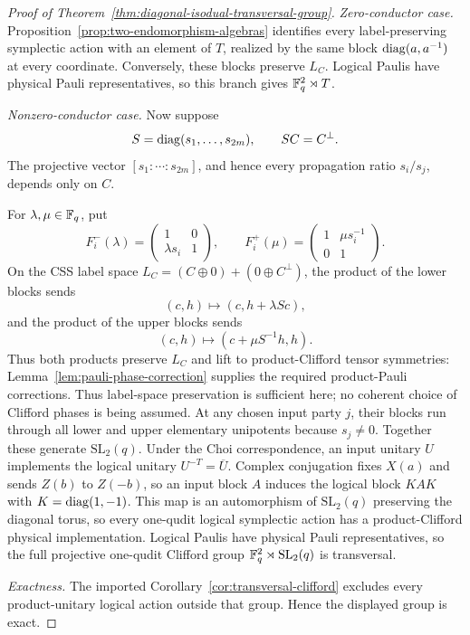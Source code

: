 \begin{proof}[Proof of
Theorem~\ref{thm:diagonal-isodual-transversal-group}]

\medskip\noindent\emph{Zero-conductor case.}
Proposition~\ref{prop:two-endomorphism-algebras} identifies every
label-preserving symplectic action with an element of \(T\), realized by the
same block \(\operatorname{diag}(a,a^{-1})\) at every coordinate.  Conversely, these blocks
preserve \(L_C\).  Logical Paulis have physical Pauli representatives, so this
branch gives \(\mathbb F_q^2\rtimes T\).

\medskip\noindent\emph{Nonzero-conductor case.}
Now suppose
\begin{equation}\label{eq:diagonal-duality-witness}
 S=\operatorname{diag}(s_1,\ldots,s_{2m}),\qquad SC=C^\perp .
\end{equation}
The projective vector \([s_1:\cdots:s_{2m}]\), and hence every propagation
ratio \(s_i/s_j\), depends only on \(C\).

For \(\lambda,\mu\in\mathbb F_q\), put
\begin{equation}\label{eq:duality-shears}
 F_i^-(\lambda)=
 \begin{pmatrix}1&0\\ \lambda s_i&1\end{pmatrix},
 \qquad
 F_i^+(\mu)=
 \begin{pmatrix}1&\mu s_i^{-1}\\0&1\end{pmatrix}.
\end{equation}
On the CSS label space
\(L_C=(C\oplus0)+(0\oplus C^\perp)\), the product of the lower blocks
sends
\[
 (c,h)\longmapsto(c,h+\lambda Sc),
\]
and the product of the upper blocks sends
\[
 (c,h)\longmapsto(c+\mu S^{-1}h,h).
\]
Thus both products preserve \(L_C\) and lift to product-Clifford tensor
symmetries: Lemma~\ref{lem:pauli-phase-correction} supplies the required
product-Pauli corrections.  Thus label-space preservation is sufficient
here; no coherent choice of Clifford phases is being assumed.
At any chosen input party \(j\), their blocks run through all lower and
upper elementary unipotents because \(s_j\ne0\).  Together these generate
\(\mathrm{SL}_2(q)\).  Under the Choi correspondence, an input unitary
\(U\) implements the logical unitary \(U^{-T}=\overline{U}\).  Complex
conjugation fixes \(X(a)\) and sends \(Z(b)\) to \(Z(-b)\), so an input
block \(A\) induces the logical block \(KAK\) with \(K=\operatorname{diag}(1,-1)\).
This map is an automorphism of \(\mathrm{SL}_2(q)\) preserving the
diagonal torus, so every one-qudit logical symplectic action has a
product-Clifford physical implementation.  Logical Paulis have
physical Pauli representatives, so the full projective one-qudit
Clifford group
\(\mathbb F_q^2\rtimes\mathrm{SL}_2(q)\) is transversal.

\medskip\noindent\emph{Exactness.}
The imported Corollary~\ref{cor:transversal-clifford} excludes every product-unitary
logical action outside that group.  Hence the displayed group is exact.
\end{proof}

